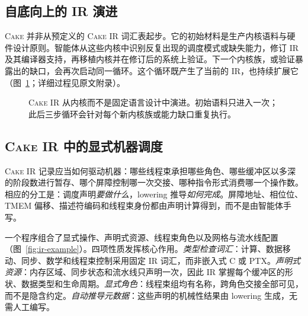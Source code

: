 \documentclass[10pt]{article}
\newcommand{\cake}{\textsc{Cake}}
\newcommand{\cakeir}{\textsc{Cake IR}}
\begin{document}
\subsection{自底向上的 IR 演进}
\label{sec:bottom-up-ir}

\cake{} 并非从预定义的 \cakeir{} 词汇表起步。它的初始材料是生产内核语料与硬件设计原则。智能体从这些内核中识别反复出现的调度模式或缺失能力，修订 IR 及其编译器支持，再移植内核并在修订后的系统上验证。下一个内核族，或验证暴露出的缺口，会再次启动同一循环。这个循环既产生了当前的 IR，也持续扩展它（图~\ref{fig:ir-evolution}；详细过程见原文附录）。

\begin{figure}[!htbp]
  \centering
  
  \caption{\cakeir{} 从内核而不是固定语言设计中演进。初始语料只进入一次；此后三步循环会针对每个新内核族或能力缺口重复执行。}
  \label{fig:ir-evolution}
\end{figure}

\FloatBarrier

\subsection{\cakeir{} 中的显式机器调度}
\label{sec:cake-ir}

\cakeir{} 记录应当如何驱动机器：哪些线程束承担哪些角色、哪些缓冲区以多深的阶段数进行暂存、哪个屏障控制哪一次交接、哪种指令形式消费哪一个操作数。相应的分工是：调度声明\emph{要做什么}，lowering 推导\emph{如何完成}。屏障地址、相位位、TMEM 偏移、描述符编码和线程束身份都由声明计算得到，而不是由智能体手写。

一个程序组合了显式操作、声明式资源、线程束角色以及网格与流水线配置（图~\ref{fig:ir-example}）。四项性质发挥核心作用。\emph{类型检查词汇}：计算、数据移动、同步、数学和线程束控制采用固定 IR 词汇，而非嵌入式 C 或 PTX。\emph{声明式资源}：内存区域、同步状态和流水线只声明一次，因此 IR 掌握每个缓冲区的形状、数据类型和生命周期。\emph{显式角色}：线程束组均有名称，跨角色交接全部可见，而不是隐含约定。\emph{自动推导元数据}：这些声明的机械性结果由 lowering 生成，无需人工编写。
\end{document}
